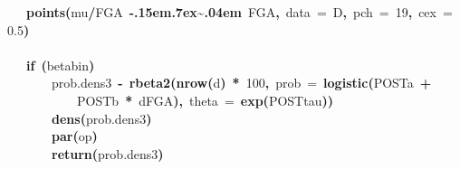 \documentclass{article}
\makeatletter
\newcommand{\hlnumber}[1]{\textcolor[rgb]{0,0,0}{#1}}%
\newcommand{\hlfunctioncall}[1]{\textcolor[rgb]{.5,0,.33}{\textbf{#1}}}%
\newcommand{\hlkeyword}[1]{\textbf{#1}}%
\newcommand{\hlargument}[1]{\textcolor[rgb]{.69,.25,.02}{#1}}%
\newcommand{\hlassignement}[1]{\textbf{#1}}%
\newcommand{\hlsymbol}[1]{#1}%
\def\urltilda{\kern -.15em\lower .7ex\hbox{\~{}}\kern .04em}%
\newcommand{\hlstd}[1]{\textcolor[rgb]{0,0,0}{#1}}%
\newenvironment{kframe}{%
 \def\FrameCommand##1{\hskip\@totalleftmargin \hskip-\fboxsep
 \colorbox{shadecolor}{##1}\hskip-\fboxsep
     \hskip-\linewidth \hskip-\@totalleftmargin \hskip\columnwidth}%
 \MakeFramed {\advance\hsize-\width
   \@totalleftmargin\z@ \linewidth\hsize
   \@setminipage}}%
 {\par\unskip\endMakeFramed}
\newenvironment{knitrout}{}{} %
\makeatother
\begin{document}
\begin{knitrout}
{\begin{kframe}
\begin{flushleft}
\hlstd{}{\ }{\ }{\ }{\ }\hlfunctioncall{points}\hlkeyword{(}\hlsymbol{mu}\hlkeyword{/}\hlsymbol{FGA}{\ }\hlkeyword{\urltilda{}}{\ }\hlsymbol{FGA}\hlkeyword{,}{\ }\hlargument{data}{\ }\hlargument{=}{\ }\hlsymbol{D}\hlkeyword{,}{\ }\hlargument{pch}{\ }\hlargument{=}{\ }\hlnumber{19}\hlkeyword{,}{\ }\hlargument{cex}{\ }\hlargument{=}{\ }\hlnumber{0.5}\hlkeyword{)}\hspace*{\fill}\\
\hlstd{}\hspace*{\fill}\\
\hlstd{}{\ }{\ }{\ }{\ }\hlkeyword{if}{\ }\hlkeyword{(}\hlsymbol{betabin}\hlkeyword{)}{\ }\hlkeyword{\usebox{\hlnormalsizeboxopenbrace}}\hspace*{\fill}\\
\hlstd{}{\ }{\ }{\ }{\ }{\ }{\ }{\ }{\ }\hlsymbol{prob.dens3}{\ }\hlassignement{\usebox{\hlnormalsizeboxlessthan}-}{\ }\hlfunctioncall{rbeta2}\hlkeyword{(}\hlfunctioncall{nrow}\hlkeyword{(}\hlsymbol{d}\hlkeyword{)}{\ }\hlkeyword{*}{\ }\hlnumber{100}\hlkeyword{,}{\ }\hlargument{prob}{\ }\hlargument{=}{\ }\hlfunctioncall{logistic}\hlkeyword{(}\hlsymbol{POST}\hlkeyword{\usebox{\hlnormalsizeboxdollar}}\hlsymbol{a}{\ }\hlkeyword{+}\hspace*{\fill}\\
\hlstd{}{\ }{\ }{\ }{\ }{\ }{\ }{\ }{\ }{\ }{\ }{\ }{\ }\hlsymbol{POST}\hlkeyword{\usebox{\hlnormalsizeboxdollar}}\hlsymbol{b}{\ }\hlkeyword{*}{\ }\hlsymbol{d}\hlkeyword{\usebox{\hlnormalsizeboxdollar}}\hlsymbol{FGA}\hlkeyword{)}\hlkeyword{,}{\ }\hlargument{theta}{\ }\hlargument{=}{\ }\hlfunctioncall{exp}\hlkeyword{(}\hlsymbol{POST}\hlkeyword{\usebox{\hlnormalsizeboxdollar}}\hlsymbol{tau}\hlkeyword{)}\hlkeyword{)}\hspace*{\fill}\\
\hlstd{}{\ }{\ }{\ }{\ }{\ }{\ }{\ }{\ }\hlfunctioncall{dens}\hlkeyword{(}\hlsymbol{prob.dens3}\hlkeyword{)}\hspace*{\fill}\\
\hlstd{}{\ }{\ }{\ }{\ }{\ }{\ }{\ }{\ }\hlfunctioncall{par}\hlkeyword{(}\hlsymbol{op}\hlkeyword{)}\hspace*{\fill}\\
\hlstd{}{\ }{\ }{\ }{\ }{\ }{\ }{\ }{\ }\hlfunctioncall{return}\hlkeyword{(}\hlsymbol{prob.dens3}\hlkeyword{)}\hspace*{\fill}\\
\hlstd{}{\ }{\ }{\ }{\ }\hlkeyword{\usebox{\hlnormalsizeboxclosebrace}}\hspace*{\fill}\\

\end{flushleft}
\end{kframe}}
\end{knitrout}
\end{document}
